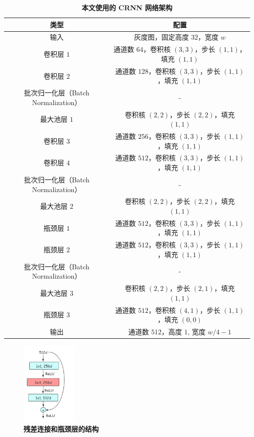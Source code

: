 \begin{table}[!hpt]
	\caption[]{\textbf{本文使用的 CRNN 网络架构}\label{tab:crnn}}
	\small
	\centering
	\begin{tabular}{cc}
		\hline
		\textbf{类型} & \textbf{配置} \\ [0.5ex] 
		\hline
		输入 & 灰度图，固定高度 $32$，宽度 $w$ \\
		卷积层 $1$ & 通道数 $64$，卷积核 $(3,3)$，步长 $(1,1)$，填充 $(1,1)$ \\
		卷积层 $2$ & 通道数 $128$，卷积核 $(3,3)$，步长 $(1,1)$，填充 $(1,1)$ \\
		批次归一化层（Batch Normalization） & - \\
		最大池层 $1$ & 卷积核 $(2,2)$，步长 $(2,2)$，填充 $(1,1)$ \\
		卷积层 $3$ & 通道数 $256$，卷积核 $(3,3)$，步长 $(1,1)$，填充 $(1,1)$ \\
		卷积层 $4$ & 通道数 $512$，卷积核 $(3,3)$，步长 $(1,1)$，填充 $(1,1)$ \\
		批次归一化层（Batch Normalization） & - \\
		最大池层 $2$ & 卷积核 $(2,2)$，步长 $(2,2)$，填充 $(1,1)$ \\
		瓶颈层 $1$ & 通道数 $512$，卷积核 $(3,3)$，步长 $(1,1)$，填充 $(1,1)$ \\
		瓶颈层 $2$ & 通道数 $512$，卷积核 $(3,3)$，步长 $(1,1)$，填充 $(1,1)$ \\
		批次归一化层（Batch Normalization） & - \\
		最大池层 $3$ & 卷积核 $(2,2)$，步长 $(2,1)$，填充 $(1,1)$ \\
		瓶颈层 $3$ & 通道数 $512$，卷积核 $(4,1)$，步长 $(1,1)$，填充 $(0,0)$ \\
		输出 & 通道数 $512$，高度 $1$, 宽度 $w / 4 - 1$ \\ 
		\hline
	\end{tabular}
\end{table}

\begin{figure}[h!]
	\centering
	\includegraphics[width=0.25\textwidth]{figure/resources/bottleneck.png}
	\caption{\textbf{残差连接和瓶颈层的结构}\label{bottleneck}}
\end{figure}

